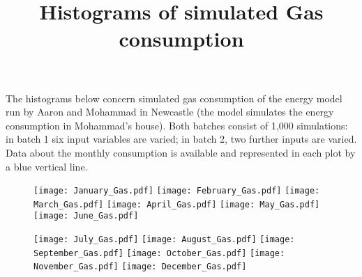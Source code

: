 \documentclass[a4paper, 12pt]{article}
\title{Histograms of simulated Gas consumption}
\author{}
\date{}
\begin{document}
\maketitle
 
The histograms below concern simulated gas consumption of the energy model run by Aaron and Mohammad in Newcastle (the model simulates the energy consumption in Mohammad's house). Both batches consist of 1,000 simulations: in batch 1 six input variables are varied; in batch 2, two further inputs are varied.
Data about the monthly consumption is available and represented in each plot by a blue vertical line.


\begin{figure}
\centering
\texttt{[image: January\_Gas.pdf]}
\texttt{[image: February\_Gas.pdf]}
\texttt{[image: March\_Gas.pdf]}
\texttt{[image: April\_Gas.pdf]}
\texttt{[image: May\_Gas.pdf]}
\texttt{[image: June\_Gas.pdf]}
\end{figure}


\begin{figure}
\centering
\texttt{[image: July\_Gas.pdf]}
\texttt{[image: August\_Gas.pdf]}
\texttt{[image: September\_Gas.pdf]}
\texttt{[image: October\_Gas.pdf]}
\texttt{[image: November\_Gas.pdf]}
\texttt{[image: December\_Gas.pdf]}
\end{figure}
\end{document}
